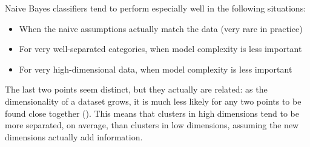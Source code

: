 Naive Bayes classifiers tend to perform especially well in the following situations:
\begin{itemize}
    \item When the naive assumptions actually match the data (very rare in practice)
    \item For very well-separated categories, when model complexity is less important
    \item For very high-dimensional data, when model complexity is less important
\end{itemize}
The last two points seem distinct, but they actually are related: as the dimensionality of a dataset grows, it is much less likely for any two points to be found close together (). This means that clusters in high dimensions tend to be more separated, on average, than clusters in low dimensions, assuming the new dimensions actually add information.